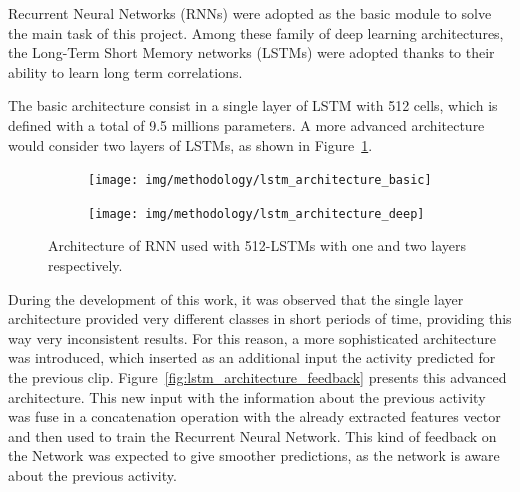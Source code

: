 Recurrent Neural Networks (RNNs) were adopted as the basic module to solve the main task of this project. Among these family of deep learning architectures, the Long-Term Short Memory networks (LSTMs) were adopted thanks to their ability to learn long term correlations. %

The basic architecture consist in a single layer of LSTM with 512 cells, which is defined with a total of 9.5 millions parameters. A more advanced architecture would consider two layers of LSTMs, as shown in  Figure~\ref{fig:lstm_architecture}.%

\begin{figure}[H]
\centering
\begin{subfigure}[b]{.5\textwidth}
  \centering
  \texttt{[image: img/methodology/lstm\_architecture\_basic]}
\end{subfigure}%
\begin{subfigure}[b]{.5\textwidth}
  \centering
  \texttt{[image: img/methodology/lstm\_architecture\_deep]}
\end{subfigure}
\caption{Architecture of RNN used with 512-LSTMs with one and two layers respectively.}
\label{fig:lstm_architecture}
\end{figure}

During the development of this work, it was observed that the single layer architecture provided very different classes in short periods of time, providing this way very inconsistent results. For this reason, a more sophisticated architecture was introduced, which inserted as
an additional input the activity predicted for the previous clip.
Figure~\ref{fig:lstm_architecture_feedback} presents this advanced architecture. 
This new input with the information about the previous activity was 
fuse in a concatenation operation with the already extracted features vector and then used to train the Recurrent Neural Network. This kind of feedback on the Network was expected to give smoother predictions, as the network is aware about the previous activity.


